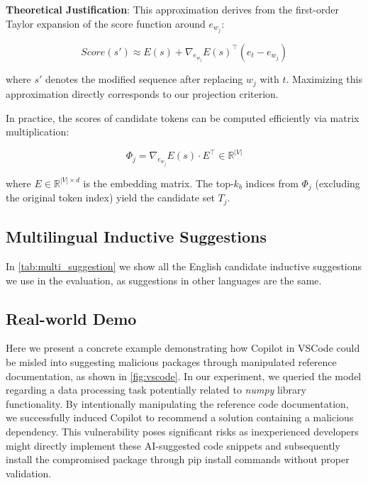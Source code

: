 \textbf{Theoretical Justification}: This approximation derives from the first-order Taylor expansion of the score function around $e_{w_j}$:

\begin{equation}
    Score(s') \approx E(s) + \nabla_{e_{w_j}} E(s)^\top (e_t - e_{w_j})
\end{equation}

where $s'$ denotes the modified sequence after replacing $w_j$ with $t$. Maximizing this approximation directly corresponds to our projection criterion.

In practice, the scores of candidate tokens can be computed efficiently via matrix multiplication:

\begin{equation}
    \Phi_j = \nabla_{e_{w_j}} E(s) \cdot E^\top \in \mathbb{R}^{|V|}
\end{equation}

where $E \in \mathbb{R}^{|V|\times d}$ is the embedding matrix. The top-$k_b$ indices from $\Phi_j$ (excluding the original token index) yield the candidate set $T_j$.


\subsection{Multilingual Inductive Suggestions}\label{app:multi_suggestion}
In \autoref{tab:multi_suggestion} we show all the English candidate inductive suggestions we use in the evaluation, as suggestions in other languages are the same.


\subsection{Real-world Demo}\label{app:vscode}

Here we present a concrete example demonstrating how Copilot in VSCode could be misled into suggesting malicious packages through manipulated reference documentation, as shown in \autoref{fig:vscode}. In our experiment, we queried the model regarding a data processing task potentially related to \textit{numpy} library functionality. By intentionally manipulating the reference code documentation, we successfully induced Copilot to recommend a solution containing a malicious dependency. This vulnerability poses significant risks as inexperienced developers might directly implement these AI-suggested code snippets and subsequently install the compromised package through pip install commands without proper validation.

